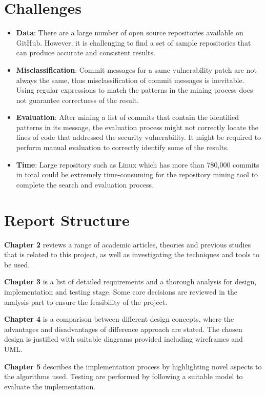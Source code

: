 \documentclass[12pt, a4paper]{report}
\begin{document}
\section{Challenges}
\label{sec:challenges}
\begin{itemize}
	\item \textbf{Data}: There are a large number of open source repositories available on GitHub.
	However, it is challenging to find a set of sample repositories that can produce accurate and
	consistent results.
	\item \textbf{Misclassification}: Commit messages for a same vulnerability patch are not always
	the same, thus misclassification of commit messages is inevitable. Using regular expressions to
	match the patterns in the mining process does not guarantee correctness of the result.
	\item \textbf{Evaluation}: After mining a list of commits that contain the identified patterns in
	its message, the evaluation process might not correctly locate the lines of code that addressed
	the security vulnerability. It might be required to perform manual evaluation to correctly
	identify some of the results.
	\item \textbf{Time}: Large repository such as Linux which has more than 780,000 commits in total
	\cite{linux_repo} could be extremely time-consuming for the repository mining tool to complete the
	search and evaluation process.
\end{itemize}

\section{Report Structure}
\textbf{Chapter 2} reviews a range of academic articles, theories and previous studies that
is related to this project, as well as investigating the techniques and tools to be used.

\noindent\textbf{Chapter 3} is a list of detailed requirements and a thorough analysis for design,
implementation and testing stage. Some core decisions are reviewed in the analysis part to ensure
the feasibility of the project.

\noindent\textbf{Chapter 4} is a comparison between different design concepts, where the advantages
and disadvantages of difference approach are stated. The chosen design is justified with suitable
diagrams provided including wireframes and UML.

\noindent\textbf{Chapter 5} describes the implementation process by highlighting novel aspects to
the algorithms used. Testing are performed by following a suitable model to evaluate the
implementation.
\end{document}
